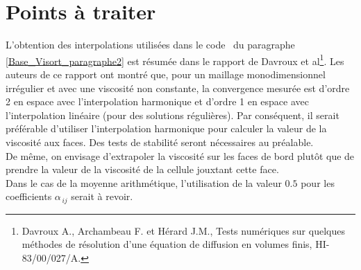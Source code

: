 \section*{Points \`a traiter}
L'obtention des interpolations utilisées dans le code \CS \ du paragraphe
\ref{Base_Visort_paragraphe2} est résumée dans le rapport de Davroux et al\footnote{Davroux A., Archambeau F. et Hérard J.M., Tests numériques sur
quelques méthodes de résolution d'une équation de diffusion en volumes finis,
HI-83/00/027/A.}.
Les auteurs de ce rapport ont montré que, pour un maillage monodimensionnel irrégulier et avec une
viscosité non constante, la convergence mesurée est d'ordre 2 en espace avec
l'interpolation harmonique et d'ordre 1 en espace avec l'interpolation
linéaire (pour des solutions régulières). Par conséquent, il serait préférable d'utiliser l'interpolation
harmonique pour calculer la valeur de la viscosité aux faces. Des tests de stabilité seront nécessaires au préalable.\\
De même, on envisage d'extrapoler la viscosité sur les faces de bord plutôt que
de prendre la valeur de la viscosité de la cellule jouxtant cette face.\\
Dans le cas de la moyenne arithm\'etique, l'utilisation de la valeur $0.5$ pour les coefficients $\alpha_{\,ij}$ serait \`a revoir.
